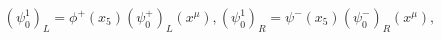 \begin{equation}
(\psi^1_0)_L=\phi^+(x_5) (\psi_0^+)_L(x^\mu), (\psi^1_0)_R=\psi^-(x_5) (\psi_0^-)_R(x^\mu),
\end{equation}


